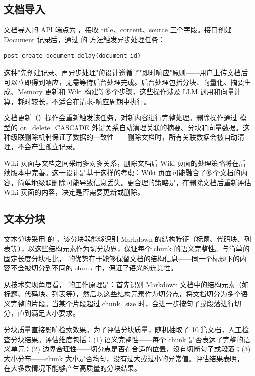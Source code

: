 \subsection{文档导入}

文档导入的 API 端点为 ，接收 title、content、source 三个字段。接口创建 Document 记录后，通过  的  方法触发异步处理任务：

\begin{lstlisting}[style=mtcode,language=Python,caption={文档导入后的异步任务触发}]
post_create_document.delay(document_id)
\end{lstlisting}

这种"先创建记录、再异步处理"的设计遵循了"即时响应"原则——用户上传文档后可以立即得到响应，无需等待后台处理完成。后台处理包括分块、向量化、摘要生成、Memory 更新和 Wiki 构建等多个步骤，这些操作涉及 LLM 调用和向量计算，耗时较长，不适合在请求-响应周期中执行。

文档更新（）操作会重新触发该任务，对新内容进行完整处理。删除操作通过  模型的 on\_delete=CASCADE 外键关系自动清理关联的摘要、分块和向量数据。这种级联删除机制保证了数据的一致性——删除文档时，所有关联数据会被自动清理，不会产生孤立记录。

Wiki 页面与文档之间采用多对多关系，删除文档后 Wiki 页面的处理策略将在后续版本中完善。这一设计是基于这样的考虑：Wiki 页面可能融合了多个文档的内容，简单地级联删除可能导致信息丢失。更合理的策略是，在删除文档后重新评估 Wiki 页面的内容，决定是否需要更新或删除。

\subsection{文本分块}

文本分块采用  的 ，该分块器能够识别 Markdown 的结构特征（标题、代码块、列表等），以这些结构元素作为切分边界，保证每个 chunk 的语义完整性。与简单的固定长度分块相比， 的优势在于能够保留文档的结构信息——同一个标题下的内容不会被切分到不同的 chunk 中，保证了语义的连贯性。

从技术实现角度看， 的工作原理是：首先识别 Markdown 文档中的结构元素（如标题、代码块、列表等），然后以这些结构元素作为切分点，将文档切分为多个语义完整的片段。当某个片段超过 chunk\_size 时，会进一步按句子或段落进行切分，直到满足大小要求。

分块质量直接影响检索效果。为了评估分块质量，随机抽取了 10 篇文档，人工检查分块结果。评估维度包括：(1) 语义完整性——每个 chunk 是否表达了完整的语义单元；(2) 边界合理性——切分点是否在合适的位置，没有切断句子或段落；(3) 大小分布——chunk 大小是否均匀，没有过大或过小的异常值。评估结果表明， 在大多数情况下能够产生高质量的分块结果。

